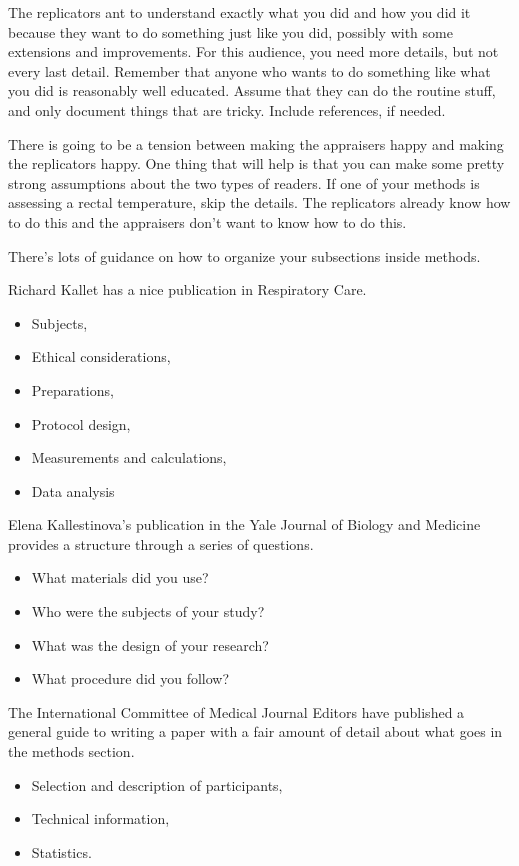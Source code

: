 \documentclass[
  letterpaper,
  DIV=11,
  numbers=noendperiod]{scrreprt}
\providecommand{\tightlist}{%
  \setlength{\itemsep}{0pt}\setlength{\parskip}{0pt}}
\begin{document}
\begin{tcolorbox}
The replicators ant to understand exactly what you did and how you did
it because they want to do something just like you did, possibly with
some extensions and improvements. For this audience, you need more
details, but not every last detail. Remember that anyone who wants to do
something like what you did is reasonably well educated. Assume that
they can do the routine stuff, and only document things that are tricky.
Include references, if needed.

There is going to be a tension between making the appraisers happy and
making the replicators happy. One thing that will help is that you can
make some pretty strong assumptions about the two types of readers. If
one of your methods is assessing a rectal temperature, skip the details.
The replicators already know how to do this and the appraisers don't
want to know how to do this.

There's lots of guidance on how to organize your subsections inside
methods.

Richard Kallet has a nice publication in Respiratory Care.

\begin{itemize}
\tightlist
\item
  Subjects,
\item
  Ethical considerations,
\item
  Preparations,
\item
  Protocol design,
\item
  Measurements and calculations,
\item
  Data analysis
\end{itemize}

Elena Kallestinova's publication in the Yale Journal of Biology and
Medicine provides a structure through a series of questions.

\begin{itemize}
\tightlist
\item
  What materials did you use?
\item
  Who were the subjects of your study?
\item
  What was the design of your research?
\item
  What procedure did you follow?
\end{itemize}

The International Committee of Medical Journal Editors have published a
general guide to writing a paper with a fair amount of detail about what
goes in the methods section.

\begin{itemize}
\tightlist
\item
  Selection and description of participants,
\item
  Technical information,
\item
  Statistics.
\end{itemize}


\end{tcolorbox}
\end{document}
